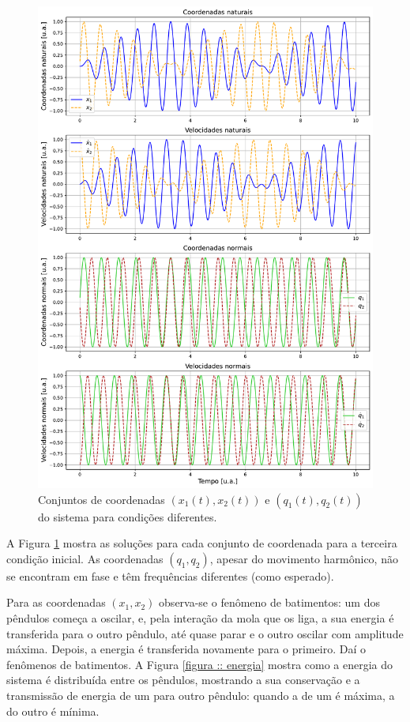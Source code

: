 \documentclass[a4paper, 11pt]{article}
\begin{document}
    \begin{figure}[h!]
        \centering
        \includegraphics[width=1\linewidth]{graph_coordenadas_diferentes.pdf}
        \caption{Conjuntos de coordenadas $(x_1(t),x_2(t))$ e $(q_1(t),q_2(t))$ do sistema para condições diferentes.
        \label{figura :: coordenadas condições diferentes}}
    \end{figure}

    A Figura \ref{figura :: coordenadas condições diferentes} mostra as soluções para cada conjunto de coordenada para a terceira condição inicial. As coordenadas $(q_1,q_2)$, apesar do movimento harmônico, não se encontram em fase e têm frequências diferentes (como esperado). 

    Para as coordenadas $(x_1,x_2)$ observa-se o fenômeno de batimentos: um dos pêndulos começa a oscilar, e, pela interação da mola que os liga, a sua energia é transferida para o outro pêndulo, até quase parar e o outro oscilar com amplitude máxima. Depois, a energia é transferida novamente para o primeiro. Daí o fenômenos de batimentos. A Figura \ref{figura :: energia} mostra como a energia do sistema é distribuída entre os pêndulos, mostrando a sua conservação e a transmissão de energia de um para outro pêndulo: quando a de um é máxima, a do outro é mínima.
\end{document}
